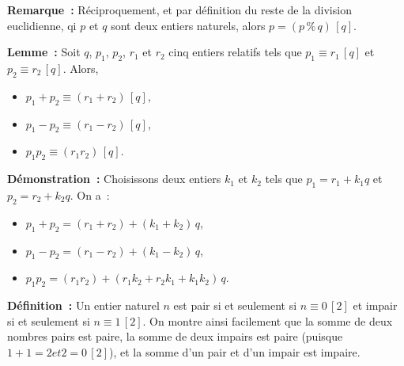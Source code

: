    \done

\medskip 

\noindent\textbf{Remarque :} Réciproquement, et par définition du reste de la division euclidienne, qi $p$ et $q$ sont deux entiers naturels, alors $p = (p \mathrel{\%} q) \, [q]$.

\medskip 

\noindent\textbf{Lemme :} Soit $q$, $p_1$, $p_2$, $r_1$ et $r_2$ cinq entiers relatifs tels que $p_1 \equiv r_1 \, [q]$ et $p_2 \equiv r_2 \, [q]$.
Alors, 
\begin{itemize}[nosep]
    \item $p_1 + p_2 \equiv (r_1 + r_2) \, [q]$, 
    \item $p_1 - p_2 \equiv (r_1 - r_2) \, [q]$, 
    \item $p_1 p_2 \equiv (r_1 r_2) \, [q]$.
\end{itemize}

\medskip

\noindent\textbf{Démonstration :} Choisissons deux entiers $k_1$ et $k_2$ tels que $p_1 = r_1 + k_1 q$ et $p_2 = r_2 + k_2 q$. 
On a :
\begin{itemize}[nosep]
    \item $p_1 + p_2 = (r_1 + r_2) + (k_1 + k_2) \, q$, 
    \item $p_1 - p_2 = (r_1 - r_2) + (k_1 - k_2) \, q$, 
    \item $p_1 p_2 = (r_1 r_2) + (r_1 k_2 + r_2 k_1 + k_1 k_2) \, q$.
\end{itemize}

\done

\bigskip

\noindent\textbf{Définition :} Un entier naturel $n$ est pair si et seulement si $n \equiv 0 \, [2]$ et impair si et seulement si $n \equiv 1 \, [2]$. 
On montre ainsi facilement que la somme de deux nombres pairs est paire, la somme de deux impairs est paire (puisque $1 + 1 = 2 et 2 = 0 \, [2]$), et la somme d'un pair et d'un impair est impaire.
